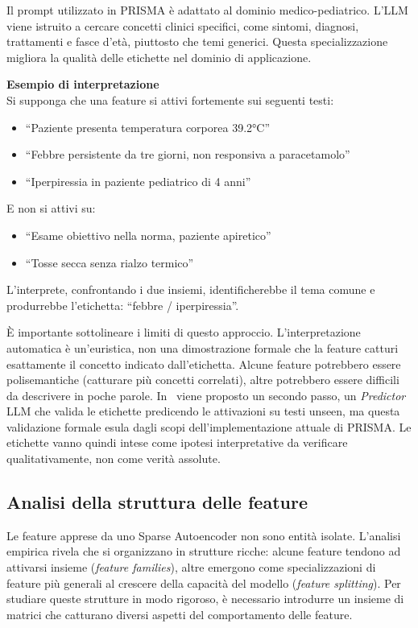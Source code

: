 Il prompt utilizzato in PRISMA è adattato al dominio medico-pediatrico. L'LLM viene istruito a cercare concetti clinici specifici, come sintomi, diagnosi, trattamenti e fasce d'età, piuttosto che temi generici. Questa specializzazione migliora la qualità delle etichette nel dominio di applicazione.

\begin{notebox}
\textbf{Esempio di interpretazione}\\
Si supponga che una feature si attivi fortemente sui seguenti testi:
\begin{itemize}
    \item ``Paziente presenta temperatura corporea 39.2°C''
    \item ``Febbre persistente da tre giorni, non responsiva a paracetamolo''
    \item ``Iperpiressia in paziente pediatrico di 4 anni''
\end{itemize}
E non si attivi su:
\begin{itemize}
    \item ``Esame obiettivo nella norma, paziente apiretico''
    \item ``Tosse secca senza rialzo termico''
\end{itemize}
L'interprete, confrontando i due insiemi, identificherebbe il tema comune e produrrebbe l'etichetta: ``febbre / iperpiressia''.
\end{notebox}
È importante sottolineare i limiti di questo approccio. L'interpretazione automatica è un'euristica, non una dimostrazione formale che la feature catturi esattamente il concetto indicato dall'etichetta. Alcune feature potrebbero essere polisemantiche (catturare più concetti correlati), altre potrebbero essere difficili da descrivere in poche parole. In~\parencite{oneill2024disentangling} viene proposto un secondo passo, un \textit{Predictor} LLM che valida le etichette predicendo le attivazioni su testi unseen, ma questa validazione formale esula dagli scopi dell'implementazione attuale di PRISMA. Le etichette vanno quindi intese come ipotesi interpretative da verificare qualitativamente, non come verità assolute.
\subsection{Analisi della struttura delle feature}
\label{subsec:feature_analysis}
Le feature apprese da uno Sparse Autoencoder non sono entità isolate. L'analisi empirica rivela che si organizzano in strutture ricche: alcune feature tendono ad attivarsi insieme (\textit{feature families}), altre emergono come specializzazioni di feature più generali al crescere della capacità del modello (\textit{feature splitting}). Per studiare queste strutture in modo rigoroso, è necessario introdurre un insieme di matrici che catturano diversi aspetti del comportamento delle feature.
